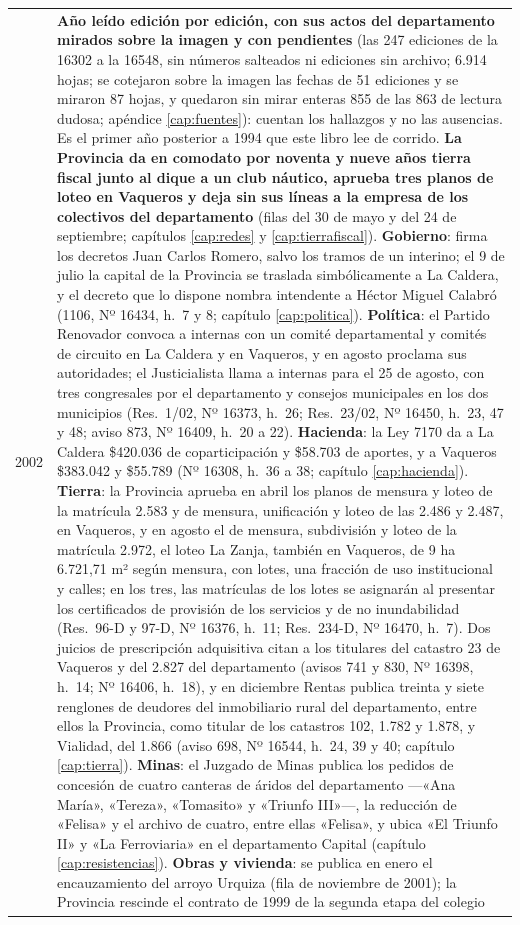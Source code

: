 \begin{longtable}{@{}p{2.7cm}p{10.3cm}@{}}
2002 & \textbf{Año leído edición por edición, con sus actos del departamento mirados sobre la imagen y con pendientes} (las 247 ediciones de la 16302 a la 16548, sin números salteados ni ediciones sin archivo; 6.914 hojas; se cotejaron sobre la imagen las fechas de 51 ediciones y se miraron 87 hojas, y quedaron sin mirar enteras 855 de las 863 de lectura dudosa; apéndice \ref{cap:fuentes}): cuentan los hallazgos y no las ausencias. Es el primer año posterior a 1994 que este libro lee de corrido. \textbf{La Provincia da en comodato por noventa y nueve años tierra fiscal junto al dique a un club náutico, aprueba tres planos de loteo en Vaqueros y deja sin sus líneas a la empresa de los colectivos del departamento} (filas del 30 de mayo y del 24 de septiembre; capítulos \ref{cap:redes} y \ref{cap:tierrafiscal}). \textbf{Gobierno}: firma los decretos Juan Carlos Romero, salvo los tramos de un interino; el 9 de julio la capital de la Provincia se traslada simbólicamente a La Caldera, y el decreto que lo dispone nombra intendente a Héctor Miguel Calabró (1106, Nº 16434, h.\ 7 y 8; capítulo \ref{cap:politica}). \textbf{Política}: el Partido Renovador convoca a internas con un comité departamental y comités de circuito en La Caldera y en Vaqueros, y en agosto proclama sus autoridades; el Justicialista llama a internas para el 25 de agosto, con tres congresales por el departamento y consejos municipales en los dos municipios (Res.\ 1/02, Nº 16373, h.\ 26; Res.\ 23/02, Nº 16450, h.\ 23, 47 y 48; aviso 873, Nº 16409, h.\ 20 a 22). \textbf{Hacienda}: la Ley 7170 da a La Caldera \$420.036 de coparticipación y \$58.703 de aportes, y a Vaqueros \$383.042 y \$55.789 (Nº 16308, h.\ 36 a 38; capítulo \ref{cap:hacienda}). \textbf{Tierra}: la Provincia aprueba en abril los planos de mensura y loteo de la matrícula 2.583 y de mensura, unificación y loteo de las 2.486 y 2.487, en Vaqueros, y en agosto el de mensura, subdivisión y loteo de la matrícula 2.972, el loteo La Zanja, también en Vaqueros, de 9 ha 6.721,71 m² según mensura, con lotes, una fracción de uso institucional y calles; en los tres, las matrículas de los lotes se asignarán al presentar los certificados de provisión de los servicios y de no inundabilidad (Res.\ 96-D y 97-D, Nº 16376, h.\ 11; Res.\ 234-D, Nº 16470, h.\ 7). Dos juicios de prescripción adquisitiva citan a los titulares del catastro 23 de Vaqueros y del 2.827 del departamento (avisos 741 y 830, Nº 16398, h.\ 14; Nº 16406, h.\ 18), y en diciembre Rentas publica treinta y siete renglones de deudores del inmobiliario rural del departamento, entre ellos la Provincia, como titular de los catastros 102, 1.782 y 1.878, y Vialidad, del 1.866 (aviso 698, Nº 16544, h.\ 24, 39 y 40; capítulo \ref{cap:tierra}). \textbf{Minas}: el Juzgado de Minas publica los pedidos de concesión de cuatro canteras de áridos del departamento ---«Ana María», «Tereza», «Tomasito» y «Triunfo III»---, la reducción de «Felisa» y el archivo de cuatro, entre ellas «Felisa», y ubica «El Triunfo II» y «La Ferroviaria» en el departamento Capital (capítulo \ref{cap:resistencias}). \textbf{Obras y vivienda}: se publica en enero el encauzamiento del arroyo Urquiza (fila de noviembre de 2001); la Provincia rescinde el contrato de 1999 de la segunda etapa del colegio 
\end{longtable}
